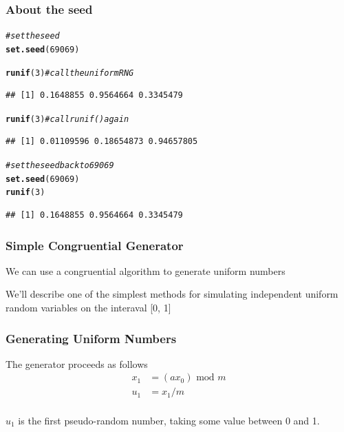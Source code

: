 \documentclass[12pt]{beamer}\usepackage[]{graphicx}\usepackage[]{color}
\makeatletter
\newcommand{\hlnum}[1]{\textcolor[rgb]{0.686,0.059,0.569}{#1}}%
\newcommand{\hlcom}[1]{\textcolor[rgb]{0.678,0.584,0.686}{\textit{#1}}}%
\newcommand{\hlstd}[1]{\textcolor[rgb]{0.345,0.345,0.345}{#1}}%
\newcommand{\hlkwd}[1]{\textcolor[rgb]{0.737,0.353,0.396}{\textbf{#1}}}%
\newenvironment{kframe}{%
 \def\at@end@of@kframe{}%
 \ifinner\ifhmode%
  \def\at@end@of@kframe{\end{minipage}}%
  \begin{minipage}{\columnwidth}%
 \fi\fi%
 \def\FrameCommand##1{\hskip\@totalleftmargin \hskip-\fboxsep
 \colorbox{shadecolor}{##1}\hskip-\fboxsep
     \hskip-\linewidth \hskip-\@totalleftmargin \hskip\columnwidth}%
 \MakeFramed {\advance\hsize-\width
   \@totalleftmargin\z@ \linewidth\hsize
   \@setminipage}}%
 {\par\unskip\endMakeFramed%
 \at@end@of@kframe}
\newenvironment{knitrout}{}{} %
\makeatother
\begin{document}

\begin{frame}[fragile]
\frametitle{About the seed}

\begin{knitrout}\footnotesize
{}\color{fgcolor}\begin{kframe}
\begin{alltt}
\hlcom{# set the seed}
\hlkwd{set.seed}\hlstd{(}\hlnum{69069}\hlstd{)}

\hlkwd{runif}\hlstd{(}\hlnum{3}\hlstd{)}  \hlcom{# call the uniform RNG}
\end{alltt}
\begin{verbatim}
## [1] 0.1648855 0.9564664 0.3345479
\end{verbatim}
\begin{alltt}
\hlkwd{runif}\hlstd{(}\hlnum{3}\hlstd{)}  \hlcom{# call runif() again}
\end{alltt}
\begin{verbatim}
## [1] 0.01109596 0.18654873 0.94657805
\end{verbatim}
\begin{alltt}
\hlcom{# set the seed back to 69069}
\hlkwd{set.seed}\hlstd{(}\hlnum{69069}\hlstd{)}
\hlkwd{runif}\hlstd{(}\hlnum{3}\hlstd{)}
\end{alltt}
\begin{verbatim}
## [1] 0.1648855 0.9564664 0.3345479
\end{verbatim}
\end{kframe}
\end{knitrout}

\end{frame}


\begin{frame}
\frametitle{Simple Congruential Generator}

We can use a congruential algorithm to generate uniform numbers

\bigskip
We'll describe one of the simplest methods for simulating independent uniform random variables on the interaval [0, 1]

\end{frame}


\begin{frame}
\frametitle{Generating Uniform Numbers}

The generator proceeds as follows
\begin{align*} 
x_1 &= (a x_0) \text{ mod } m \\
u_1 &= x_1 / m \\
\end{align*}

$u_1$ is the first pseudo-random number, taking some value between 0 and 1.

\end{frame}
\end{document}
